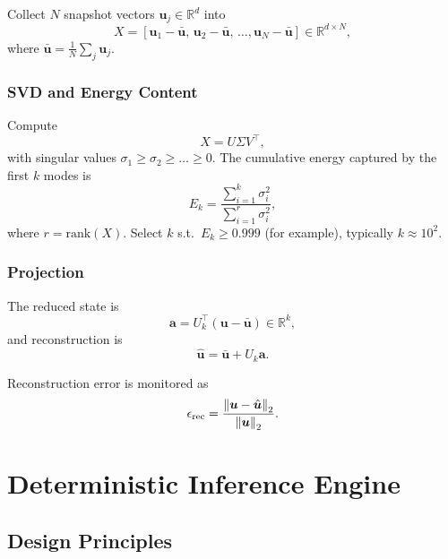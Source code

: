 \documentclass[11pt]{article}
\begin{document}
Collect $N$ snapshot vectors $\bm{u}_j \in \mathbb{R}^d$ into
\begin{equation}
  X = \left[ \bm{u}_1 - \bar{\bm{u}},\, \bm{u}_2 - \bar{\bm{u}},\, \dots, \bm{u}_N - \bar{\bm{u}} \right] \in \mathbb{R}^{d \times N},
\end{equation}
where $\bar{\bm{u}} = \frac{1}{N} \sum_j \bm{u}_j$.

\subsubsection{SVD and Energy Content}

Compute
\begin{equation}
  X = U \Sigma V^\top,
\end{equation}
with singular values $\sigma_1 \ge \sigma_2 \ge \dots \ge 0$. The cumulative energy captured by the first $k$ modes is
\begin{equation}
  E_k = \frac{\sum_{i=1}^k \sigma_i^2}{\sum_{i=1}^r \sigma_i^2},
\end{equation}
where $r = \mathrm{rank}(X)$. Select $k$ s.t.\ $E_k \ge 0.999$ (for example), typically $k \approx 10^2$.

\subsubsection{Projection}

The reduced state is
\begin{equation}
  \bm{a} = U_k^\top (\bm{u} - \bar{\bm{u}}) \in \mathbb{R}^k,
\end{equation}
and reconstruction is
\begin{equation}
  \hat{\bm{u}} = \bar{\bm{u}} + U_k \bm{a}.
\end{equation}

Reconstruction error is monitored as
\begin{equation}
  \epsilon_\mathrm{rec} = \frac{\norm{\bm{u} - \hat{\bm{u}}}_2}{\norm{\bm{u}}_2}.
\end{equation}

\section{Deterministic Inference Engine}

\subsection{Design Principles}
\end{document}
